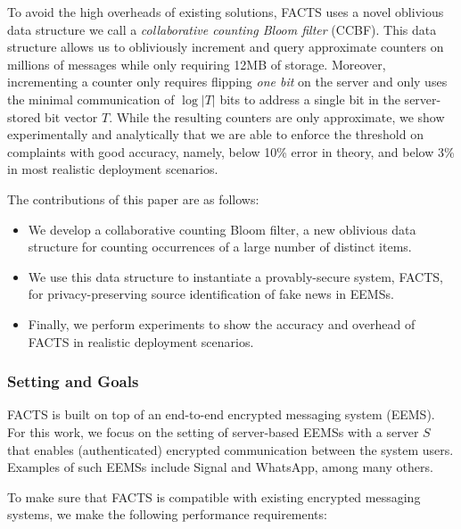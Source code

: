 To avoid the high overheads of existing solutions, FACTS uses a novel oblivious data structure we call a \emph{collaborative counting Bloom filter} (CCBF).  This data structure allows us to obliviously increment and query approximate counters on millions of messages while only requiring 12MB of storage.  Moreover, incrementing a counter only requires flipping \emph{one bit} on the server and only uses the minimal communication of $\log{|T|}$ bits to address a single bit in the server-stored bit vector $T$.  While the resulting counters are only approximate, we show experimentally and analytically that we are able to enforce the threshold on complaints with good accuracy, namely,  below 10\% error in theory, and below 3\% in most realistic deployment scenarios.   

The contributions of this paper are as follows:
\begin{itemize}
    \item We develop a collaborative counting Bloom filter, a new oblivious data structure for counting occurrences of a large number of distinct items.
    \item We use this data structure to instantiate a provably-secure system, FACTS, for privacy-preserving source identification of fake news in EEMSs.
    \item Finally, we perform experiments to show the accuracy and overhead of FACTS in realistic deployment scenarios.
\end{itemize}

\subsubsection{Setting and Goals}
FACTS is built on top of an 
end-to-end encrypted messaging system (EEMS).  For this work, we focus on the setting of server-based EEMSs with a server $S$ that enables (authenticated) encrypted communication between the system users.  Examples of such EEMSs include Signal and WhatsApp, among many others.  

To make sure that FACTS is compatible with existing encrypted messaging systems, we make the following performance requirements:

